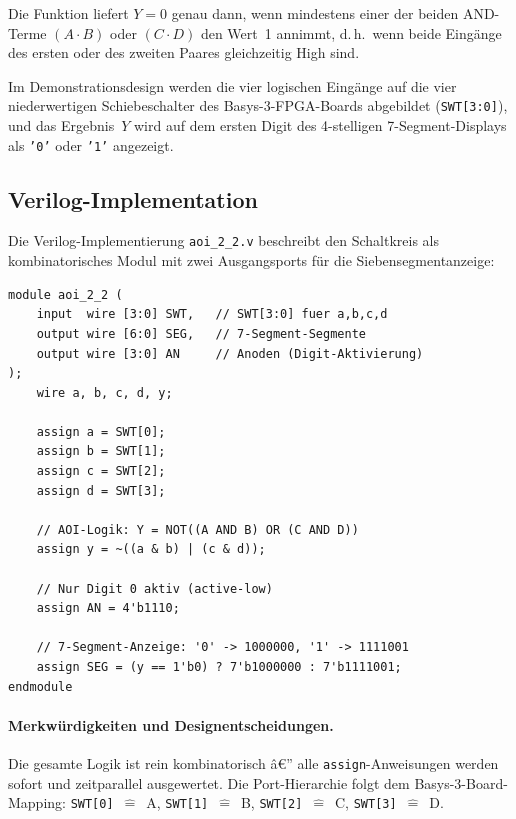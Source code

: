 ﻿\documentclass[12pt,a4paper]{report}
\begin{document}
Die Funktion liefert $Y = 0$ genau dann, wenn mindestens einer der beiden
AND-Terme $(A \cdot B)$ oder $(C \cdot D)$ den Wert~1 annimmt, d.\,h.\ wenn
beide Eingänge des ersten oder des zweiten Paares gleichzeitig High sind.

Im Demonstrationsdesign werden die vier logischen Eingänge auf die vier
niederwertigen Schiebeschalter des Basys-3-FPGA-Boards abgebildet
(\texttt{SWT[3:0]}), und das Ergebnis~$Y$ wird auf dem ersten Digit des
4-stelligen 7-Segment-Displays als \texttt{'0'} oder \texttt{'1'} angezeigt.

\subsection{Verilog-Implementation}
\label{sssec:aoi_verilog}

Die Verilog-Implementierung \texttt{aoi\_2\_2.v} beschreibt den Schaltkreis
als kombinatorisches Modul mit zwei Ausgangsports für die Siebensegmentanzeige:

\begin{lstlisting}[style=hdlstyle, caption={Verilog-Implementation des AOI-2-2-Schaltkreises (\texttt{aoi\_2\_2.v})}]
module aoi_2_2 (
    input  wire [3:0] SWT,   // SWT[3:0] fuer a,b,c,d
    output wire [6:0] SEG,   // 7-Segment-Segmente
    output wire [3:0] AN     // Anoden (Digit-Aktivierung)
);
    wire a, b, c, d, y;

    assign a = SWT[0];
    assign b = SWT[1];
    assign c = SWT[2];
    assign d = SWT[3];

    // AOI-Logik: Y = NOT((A AND B) OR (C AND D))
    assign y = ~((a & b) | (c & d));

    // Nur Digit 0 aktiv (active-low)
    assign AN = 4'b1110;

    // 7-Segment-Anzeige: '0' -> 1000000, '1' -> 1111001
    assign SEG = (y == 1'b0) ? 7'b1000000 : 7'b1111001;
endmodule
\end{lstlisting}

\paragraph{Merkwürdigkeiten und Designentscheidungen.}
Die gesamte Logik ist rein kombinatorisch â€” alle \texttt{assign}-Anweisungen
werden sofort und zeitparallel ausgewertet. Die Port-Hierarchie folgt dem
Basys-3-Board-Mapping: \texttt{SWT[0]}~$\widehat{=}$~A, \texttt{SWT[1]}~$\widehat{=}$~B,
\texttt{SWT[2]}~$\widehat{=}$~C, \texttt{SWT[3]}~$\widehat{=}$~D.
\end{document}
